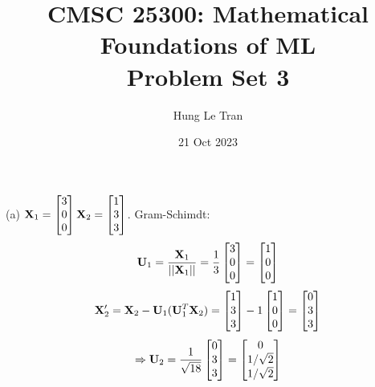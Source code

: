 \documentclass[a4paper, 12pt]{article}
\title{CMSC 25300: Mathematical Foundations of ML \\ \large Problem Set 3}
\date{21 Oct 2023}
\author{Hung Le Tran}
\begin{document}
\maketitle
\setcounter{section}{3}
\begin{problem} [Problem 1]
\end{problem}
\begin{solution}
    (a) $\mathbf{X}_1 = \begin{bmatrix}
            3 \\ 0 \\ 0
        \end{bmatrix} \mathbf{X}_2 = \begin{bmatrix}
            1 \\ 3 \\ 3
        \end{bmatrix}$. Gram-Schimdt:
    \[
        \mathbf{U}_1 = \frac{\mathbf{X}_1}{||\mathbf{X}_1||} = \frac{1}{3}\begin{bmatrix}
            3 \\ 0 \\ 0
        \end{bmatrix} = \begin{bmatrix}
            1 \\ 0 \\ 0
        \end{bmatrix}
    \]
    \[
        \mathbf{X}_2' = \mathbf{X}_2 - \mathbf{U}_1 (\mathbf{U}_1^T \mathbf{X}_2) = \begin{bmatrix}
            1 \\ 3 \\ 3
        \end{bmatrix} - 1\begin{bmatrix}
            1 \\ 0 \\ 0
        \end{bmatrix} = \begin{bmatrix}
            0 \\ 3 \\ 3
        \end{bmatrix}
    \]
    \[
        \Rightarrow \mathbf{U}_2 = \frac{1}{\sqrt{18}}\begin{bmatrix}
            0 \\ 3 \\ 3
        \end{bmatrix} = \begin{bmatrix}
            0 \\ 1/\sqrt{2} \\ 1/\sqrt{2}
        \end{bmatrix}
    \]


\end{solution}
\end{document}
